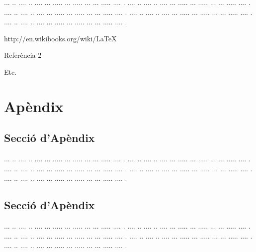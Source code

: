 ﻿\documentclass[10pt,a4paper,twocolumn,twoside]{article}
\begin{document}
... ..  .... .. .... ... ..... ... ..... ... ... ..... .... .
.... ..  .... .. .... ... ..... ... ..... ... ... ..... .... .
.... ..  .... .. .... ... ..... ... ..... ... ... ..... .... .
.... ..  .... .. .... ... ..... ... ..... ... ... ..... .... .
.... ..  .... .. .... ... ..... ... ..... ... ... ..... .... .

\begin{thebibliography}{11}
http://en.wikibooks.org/wiki/LaTeX

Referència 2

Etc.


\end{thebibliography}

\appendix

\section*{Apèndix}

\setcounter{section}{1}

\subsection{Secció d'Apèndix}


... ..  .... .. .... ... ..... ... ..... ... ... ..... .... .
.... ..  .... .. .... ... ..... ... ..... ... ... ..... .... .
.... ..  .... .. .... ... ..... ... ..... ... ... ..... .... .
.... ..  .... .. .... ... ..... ... ..... ... ... ..... .... .
.... ..  .... .. .... ... ..... ... ..... ... ... ..... .... .

\subsection{Secció d'Apèndix}


... ..  .... .. .... ... ..... ... ..... ... ... ..... .... .
.... ..  .... .. .... ... ..... ... ..... ... ... ..... .... .
.... ..  .... .. .... ... ..... ... ..... ... ... ..... .... .
.... ..  .... .. .... ... ..... ... ..... ... ... ..... .... .
.... ..  .... .. .... ... ..... ... ..... ... ... ..... .... .
\end{document}
